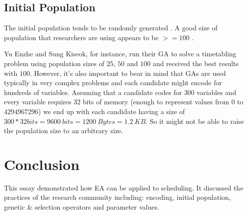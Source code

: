 \documentclass[a4paper, 12pt, titlepage]{article}
\begin{document}
\subsection*{Initial Population}

The initial population tends to be randomly generated
\cite[p.~97]{mesghouni2004} \cite[p.~29]{aljarrah2017}.  
A good size of population that researchers are using appears to be
\(>=100\) \cite[p.~101]{mesghouni2004} \cite[p.~16]{timilsina2015}
\cite{hosseinabadi2018}.

Yu Enzhe and Sung Kiseok, for instance, run their GA to solve
a timetabling problem using population sizes of \(25\), \(50\) and
\(100\) and received the best results with \(100\). \cite[p.~715]{yu2002}
However, it's also important to bear in mind that GAs are used typically
in very complex problems and each candidate might encode for hundreds
of variables. Assuming that a candidate codes for \(300\) variables and
every variable requires \(32\) bits of memory (enough to represent values
from \(0\) to \(4294967296\)) we end up with each candidate having a
size of \(300 * 32 bits = 9600\ bits = 1200\ Bytes = 1.2\ KB\).  So it
might not be able to raise the population size to an arbitrary size.



\section*{Conclusion}

This essay demonstrated how EA can be applied to scheduling.  It
discussed the practices of the research community including: encoding,
initial population, genetic \& selection operators and parameter values.
\end{document}
